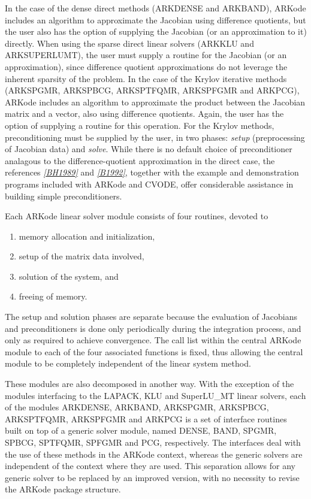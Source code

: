 \documentclass[letterpaper,10pt,english]{sphinxmanual}
\begin{document}
In the case of the dense direct methods (ARKDENSE and ARKBAND), ARKode
includes an algorithm to approximate the Jacobian using difference
quotients, but the user also has the option of supplying the Jacobian
(or an approximation to it) directly.  When using the sparse direct
linear solvers (ARKKLU and ARKSUPERLUMT), the user must supply a
routine for the Jacobian (or an approximation), since difference
quotient approximations do not leverage the inherent sparsity of the
problem.  In the case of the Krylov iterative methods (ARKSPGMR,
ARKSPBCG, ARKSPTFQMR, ARKSPFGMR and ARKPCG), ARKode includes an
algorithm to approximate the product between the Jacobian matrix and a
vector, also using difference quotients.  Again, the user has the
option of supplying a routine for this operation.  For the Krylov
methods, preconditioning must be supplied by the user, in two phases:
\emph{setup} (preprocessing of Jacobian data) and \emph{solve}.  While there is
no default choice of preconditioner analagous to the
difference-quotient approximation in the direct case, the references
\label{Organization:id3}{\hyperref[References:bh1989]{\emph{{[}BH1989{]}}}} and \label{Organization:id4}{\hyperref[References:b1992]{\emph{{[}B1992{]}}}}, together with the example and demonstration
programs included with ARKode and CVODE, offer considerable assistance
in building simple preconditioners.

Each ARKode linear solver module consists of four routines,
devoted to
\begin{enumerate}
\item {} 
memory allocation and initialization,

\item {} 
setup of the matrix data involved,

\item {} 
solution of the system, and

\item {} 
freeing of memory.

\end{enumerate}

The setup and solution phases are separate because the evaluation of
Jacobians and preconditioners is done only periodically during the
integration process, and only as required to achieve convergence.  The
call list within the central ARKode module to each of the four
associated functions is fixed, thus allowing the central module to be
completely independent of the linear system method.

These modules are also decomposed in another way.  With the exception
of the modules interfacing to the LAPACK, KLU and SuperLU\_MT linear
solvers, each of the modules ARKDENSE, ARKBAND, ARKSPGMR, ARKSPBCG,
ARKSPTFQMR, ARKSPFGMR and ARKPCG is a set of interface routines built
on top of a generic solver module, named DENSE, BAND,
SPGMR, SPBCG, SPTFQMR, SPFGMR and PCG, respectively.  The interfaces
deal with the use of these methods in the ARKode context, whereas
the generic solvers are independent of the context where they are
used.  This separation allows for any generic solver to be replaced by
an improved version, with no necessity to revise the ARKode
package structure.
\end{document}

